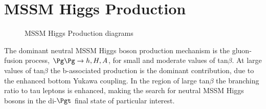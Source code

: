 \section{MSSM Higgs Production}
\begin{figure}[hb]
\centering
  \begin{subfigure}[b]{.4\textwidth}
	\end{subfigure}	
   \begin{subfigure}[b]{.4\textwidth}
    \end{subfigure}	
  	\caption[]
   	{MSSM Higgs Production diagrams}
	\label{fig:MSSMdiagrams}
\end{figure}

The dominant neutral MSSM Higgs boson production mechanism is the gluon-fusion process, 
$\Pg\Pg \to h, H, A$, for small and moderate values of tan$\beta$. At large values of tan$\beta$ 
the b-associated production is the dominant contribution, due to the enhanced bottom Yukawa 
coupling. In the region of large tan$\beta$ the branching ratio to tau leptons is enhanced, 
making the search for neutral MSSM Higgs bosons in the di-$\Pgt$ final state of particular interest. 
